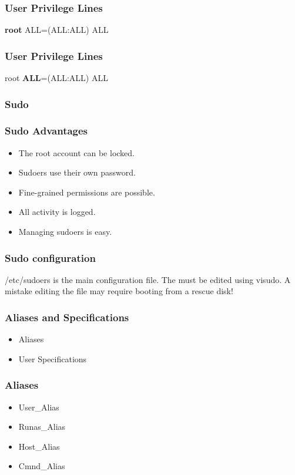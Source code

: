 \documentclass[12pt,handout,aspectratio=169]{beamer}
\begin{document}
\begin{frame}
  \frametitle{User Privilege Lines}
  \begin{block}{}
\begin{semiverbatim}
\textbf{root} ALL=(ALL:ALL) ALL
\end{semiverbatim}
  \end{block}
\end{frame}
\begin{frame}
  \frametitle{User Privilege Lines}
  \begin{block}{}
\begin{semiverbatim}
root \textbf{ALL}=(ALL:ALL) ALL
\end{semiverbatim}
  \end{block}
\end{frame}
\begin{frame}
  \frametitle{Sudo}
\end{frame}
\begin{frame}
  \frametitle{Sudo Advantages}
  \begin{itemize}
  \item The root account can be locked.
  \item Sudoers use their own password.
  \item Fine-grained permissions are possible.
  \item All activity is logged.
  \item Managing sudoers is easy.
  \end{itemize}
\end{frame}
\begin{frame}
  \frametitle{Sudo configuration}
  /etc/sudoers is the main configuration file.  The must be edited using visudo.  A mistake editing the file may require booting from a rescue disk!
\end{frame}
\begin{frame}
  \frametitle{Aliases and Specifications}
  \begin{itemize}
  \item Aliases
  \item User Specifications
  \end{itemize}
\end{frame}
\begin{frame}
  \frametitle{Aliases}
  \begin{itemize}
  \item User\_Alias
  \item Runas\_Alias
  \item Host\_Alias
  \item Cmnd\_Alias
  \end{itemize}
\end{frame}
\end{document}
